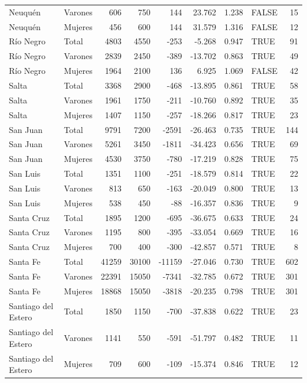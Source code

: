 \begin{table}
\begin{tabular}[t]{llrrrrrlr}
Neuquén & Varones & 606 & 750 & 144 & 23.762 & 1.238 & FALSE & 15\\
Neuquén & Mujeres & 456 & 600 & 144 & 31.579 & 1.316 & FALSE & 12\\
\addlinespace
Río Negro & Total & 4803 & 4550 & -253 & -5.268 & 0.947 & TRUE & 91\\
Río Negro & Varones & 2839 & 2450 & -389 & -13.702 & 0.863 & TRUE & 49\\
Río Negro & Mujeres & 1964 & 2100 & 136 & 6.925 & 1.069 & FALSE & 42\\
Salta & Total & 3368 & 2900 & -468 & -13.895 & 0.861 & TRUE & 58\\
Salta & Varones & 1961 & 1750 & -211 & -10.760 & 0.892 & TRUE & 35\\
\addlinespace
Salta & Mujeres & 1407 & 1150 & -257 & -18.266 & 0.817 & TRUE & 23\\
San Juan & Total & 9791 & 7200 & -2591 & -26.463 & 0.735 & TRUE & 144\\
San Juan & Varones & 5261 & 3450 & -1811 & -34.423 & 0.656 & TRUE & 69\\
San Juan & Mujeres & 4530 & 3750 & -780 & -17.219 & 0.828 & TRUE & 75\\
San Luis & Total & 1351 & 1100 & -251 & -18.579 & 0.814 & TRUE & 22\\
\addlinespace
San Luis & Varones & 813 & 650 & -163 & -20.049 & 0.800 & TRUE & 13\\
San Luis & Mujeres & 538 & 450 & -88 & -16.357 & 0.836 & TRUE & 9\\
Santa Cruz & Total & 1895 & 1200 & -695 & -36.675 & 0.633 & TRUE & 24\\
Santa Cruz & Varones & 1195 & 800 & -395 & -33.054 & 0.669 & TRUE & 16\\
Santa Cruz & Mujeres & 700 & 400 & -300 & -42.857 & 0.571 & TRUE & 8\\
\addlinespace
Santa Fe & Total & 41259 & 30100 & -11159 & -27.046 & 0.730 & TRUE & 602\\
Santa Fe & Varones & 22391 & 15050 & -7341 & -32.785 & 0.672 & TRUE & 301\\
Santa Fe & Mujeres & 18868 & 15050 & -3818 & -20.235 & 0.798 & TRUE & 301\\
Santiago del Estero & Total & 1850 & 1150 & -700 & -37.838 & 0.622 & TRUE & 23\\
Santiago del Estero & Varones & 1141 & 550 & -591 & -51.797 & 0.482 & TRUE & 11\\
\addlinespace
Santiago del Estero & Mujeres & 709 & 600 & -109 & -15.374 & 0.846 & TRUE & 12\\

\end{tabular}
\end{table}
